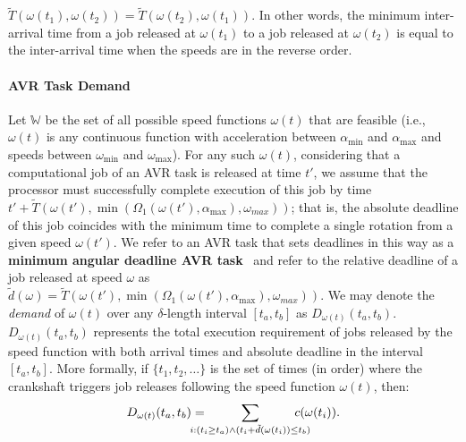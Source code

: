 \begin{property}
\label{T-reversal}
$\widetilde{T}(\omega(t_1),\omega(t_2)) = \widetilde{T}(\omega(t_2),\omega(t_1))$.
In other words, the minimum inter-arrival time from a job released at $\omega(t_1)$ to a job released at $\omega(t_2)$ is equal to the inter-arrival time when the speeds are in the reverse order.
\end{property} 


\paragraph{AVR Task Demand}
Let $\mathbb{W}$ be the set of all possible speed functions $\omega(t)$ that are feasible (i.e., $\omega(t)$ is any continuous function with acceleration between $\alpha_{\min}$ and $\alpha_{\max}$ and speeds between $\omega_{\min}$ and $\omega_{\max}$).
 For any such $\omega(t)$, considering that a computational job of an AVR task is released at time $t'$, we assume that the processor must successfully complete execution of this job by time $t' + \widetilde{T}(\omega(t'), \min(\Omega_1(\omega(t'), \alpha_{\max}),\omega_{max}))$; that is, the absolute deadline of this job coincides with the minimum time to complete a single rotation from a given speed $\omega(t')$. 
We refer to an AVR task that sets deadlines in this way as a {\bf minimum angular deadline AVR task}~\cite{biondi_modeling_2018} and refer to the relative deadline of a job released at speed $\omega$ as 
$\tilde{d}(\omega) = \widetilde{T}(\omega(t'), \min(\Omega_1(\omega(t'), \alpha_{\max}),\omega_{max}))$.
We may denote the {\em demand} of $\omega(t)$ over any $\delta$-length interval $[t_a, t_b]$ as $D_{\omega(t)}(t_a, t_b)$.
 $D_{\omega(t)}(t_a, t_b)$ represents the total execution requirement of jobs released by the speed function with both arrival times and absolute deadline in the interval $[t_a, t_b]$.
 More formally, if $\{t_1, t_2, \ldots\}$ is the set of times (in order) where the crankshaft triggers job releases following the speed function $\omega(t)$, then:
\begin{equation}
\label{eqn:d}
    D_{\omega(t)}(t_a, t_b) = \hspace{-.2in}\sum_{i: (t_i \geq t_a) 
            \wedge (t_i +\tilde{d}(\omega(t_i)) \leq t_b)}   \hspace{-.2in} c(\omega(t_i)).
\end{equation}

